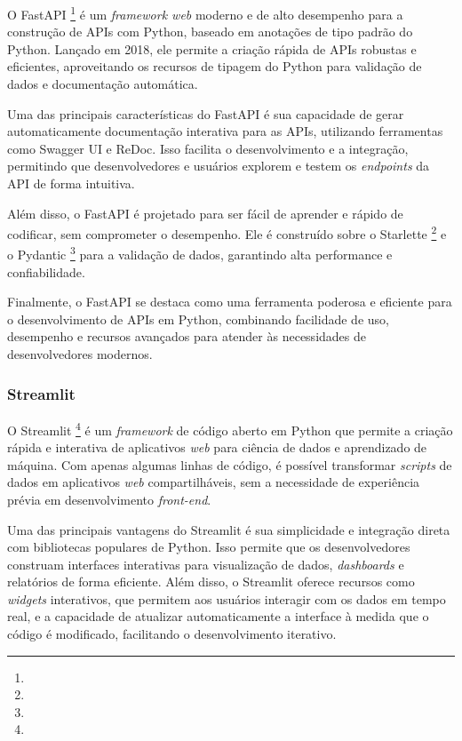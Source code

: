 \documentclass[a4paper, 12pt]{article}
\begin{document}
    O FastAPI \footnote{} é um \textit{framework web} moderno e de alto desempenho para a construção de APIs com Python, baseado em anotações de tipo padrão do Python. Lançado em 2018, ele permite a criação rápida de APIs robustas e eficientes, aproveitando os recursos de tipagem do Python para validação de dados e documentação automática.

    Uma das principais características do FastAPI é sua capacidade de gerar automaticamente documentação interativa para as APIs, utilizando ferramentas como Swagger UI e ReDoc. Isso facilita o desenvolvimento e a integração, permitindo que desenvolvedores e usuários explorem e testem os \textit{endpoints} da API de forma intuitiva.

    Além disso, o FastAPI é projetado para ser fácil de aprender e rápido de codificar, sem comprometer o desempenho. Ele é construído sobre o Starlette \footnote{} e o Pydantic \footnote{} para a validação de dados, garantindo alta performance e confiabilidade.

    Finalmente, o FastAPI se destaca como uma ferramenta poderosa e eficiente para o desenvolvimento de APIs em Python, combinando facilidade de uso, desempenho e recursos avançados para atender às necessidades de desenvolvedores modernos.

    \subsubsection{Streamlit} \label{sec:streamlit}
    
    O Streamlit \footnote{} é um \textit{framework} de código aberto em Python que permite a criação rápida e interativa de aplicativos \textit{web} para ciência de dados e aprendizado de máquina. Com apenas algumas linhas de código, é possível transformar \textit{scripts} de dados em aplicativos \textit{web} compartilháveis, sem a necessidade de experiência prévia em desenvolvimento \textit{front-end}.

    Uma das principais vantagens do Streamlit é sua simplicidade e integração direta com bibliotecas populares de Python. Isso permite que os desenvolvedores construam interfaces interativas para visualização de dados, \textit{dashboards} e relatórios de forma eficiente. Além disso, o Streamlit oferece recursos como \textit{widgets} interativos, que permitem aos usuários interagir com os dados em tempo real, e a capacidade de atualizar automaticamente a interface à medida que o código é modificado, facilitando o desenvolvimento iterativo.
\end{document}
